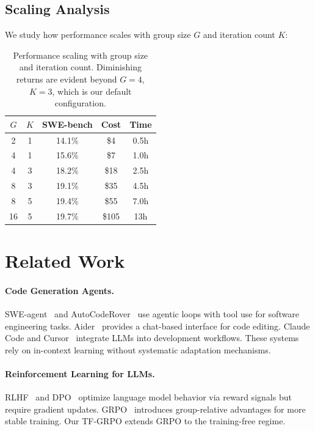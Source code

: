 \documentclass[11pt]{article}
\begin{document}
\subsection{Scaling Analysis}

We study how performance scales with group size $G$ and iteration count $K$:

\begin{table}[h]
\centering
\begin{tabular}{ccccc}
\toprule
$G$ & $K$ & SWE-bench & Cost & Time \\
\midrule
2 & 1 & 14.1\% & \$4 & 0.5h \\
4 & 1 & 15.6\% & \$7 & 1.0h \\
4 & 3 & 18.2\% & \$18 & 2.5h \\
8 & 3 & 19.1\% & \$35 & 4.5h \\
8 & 5 & 19.4\% & \$55 & 7.0h \\
16 & 5 & 19.7\% & \$105 & 13h \\
\bottomrule
\end{tabular}
\caption{Performance scaling with group size and iteration count. Diminishing
returns are evident beyond $G=4$, $K=3$, which is our default configuration.}
\label{tab:scaling}
\end{table}

\section{Related Work}
\label{sec:related}

\paragraph{Code Generation Agents.}
SWE-agent~\cite{yang2024sweagent} and AutoCodeRover~\cite{zhang2024autocoderover}
use agentic loops with tool use for software engineering tasks.
Aider~\cite{aider2024} provides a chat-based interface for code editing.
Claude Code and Cursor~\cite{cursor2024} integrate LLMs into development
workflows. These systems rely on in-context learning without systematic
adaptation mechanisms.

\paragraph{Reinforcement Learning for LLMs.}
RLHF~\cite{ouyang2022training} and DPO~\cite{rafailov2024direct} optimize
language model behavior via reward signals but require gradient updates.
GRPO~\cite{shao2024deepseekmath} introduces group-relative advantages for
more stable training. Our TF-GRPO extends GRPO to the training-free regime.
\end{document}
